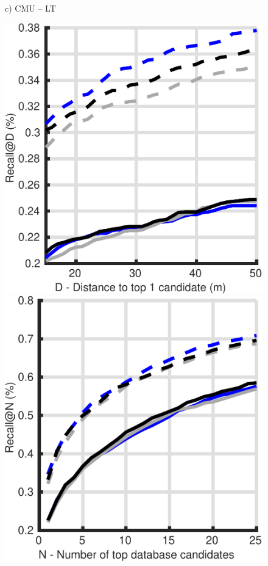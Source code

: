 \begin{figure}
\begin{minipage}{0.19\linewidth}
		c) CMU -- LT
	\end{minipage}
	\begin{minipage}{0.19\linewidth}
		\center \scriptsize
		\includegraphics[width=\linewidth]{plot/depth_vs_ref/Results_cmu_snow/distance}	
		
		\includegraphics[width=\linewidth]{plot/depth_vs_ref/Results_cmu_snow/recall}
		

\end{minipage}
\end{figure}
